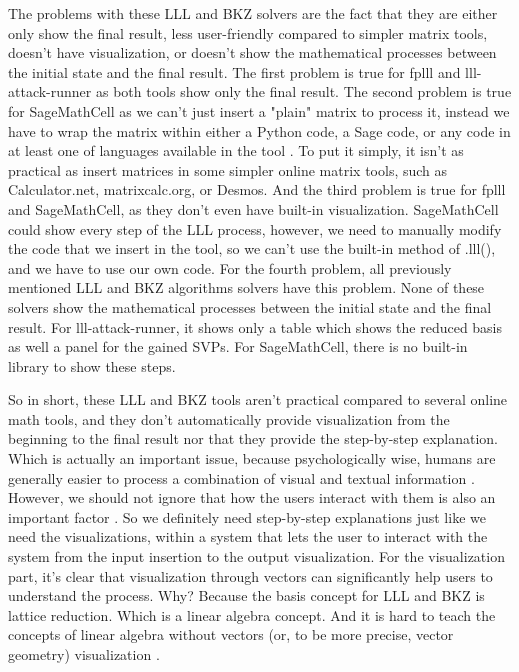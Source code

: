 \documentclass[runningheads]{llncs}
\begin{document}
The problems with these LLL and BKZ solvers are the fact that they are either only show the final result, less user-friendly compared to simpler matrix tools, doesn't have visualization, or doesn't show the mathematical processes between the initial state and the final result. The first problem is true for fplll \cite{5} and lll-attack-runner \cite{6} as both tools show only the final result. The second problem is true for SageMathCell as we can't just insert a "plain" matrix to process it, instead we have to wrap the matrix within either a Python code, a Sage code, or any code in at least one of languages available in the tool \cite{7}. To put it simply, it isn't as practical as insert matrices in some simpler online matrix tools, such as Calculator.net, matrixcalc.org, or Desmos. And the third problem is true for fplll and SageMathCell, as they don't even have built-in visualization. SageMathCell could show every step of the LLL process, however, we need to manually modify the code that we insert in the tool, so we can't use the built-in method of .lll(), and we have to use our own code. For the fourth problem, all previously mentioned LLL and BKZ algorithms solvers have this problem. None of these solvers show the mathematical processes between the initial state and the final result. For lll-attack-runner, it shows only a table which shows the reduced basis as well a panel for the gained SVPs. For SageMathCell, there is no built-in library to show these steps.

So in short, these LLL and BKZ tools aren't practical compared to several online math tools, and they don't automatically provide visualization from the beginning to the final result nor that they provide the step-by-step explanation. Which is actually an important issue, because psychologically wise, humans are generally easier to process a combination of visual and textual information \cite{8}. However, we should not ignore that how the users interact with them is also an important factor \cite{9}. So we definitely need step-by-step explanations just like we need the visualizations, within a system that lets the user to interact with the system from the input insertion to the output visualization. For the visualization part, it's clear that visualization through vectors can significantly help users to understand the process. Why? Because the basis concept for LLL and BKZ is lattice reduction. Which is a linear algebra concept. And it is hard to teach the concepts of linear algebra without vectors (or, to be more precise, vector geometry) visualization \cite{10}. 
\end{document}
